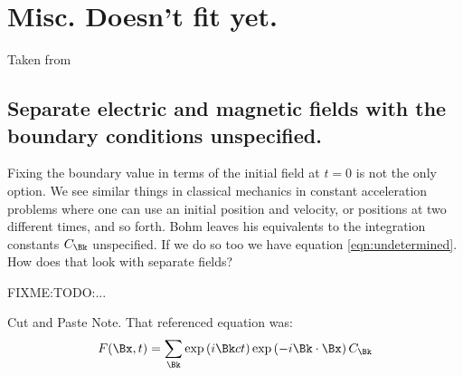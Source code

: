 \documentclass{article}
\title{}
\author{Peeter Joot \quad peeter.joot@gmail.com}
\date{ Feb dd, 2009.  Last Revision: $Date: 2009/02/22 15:11:52 $ }
\begin{document}
\maketitle{}

\tableofcontents

\section{}

\section{ Misc.  Doesn't fit yet. }

Taken from \cite{PJFourierVacuum}


\subsection{ Separate electric and magnetic fields with the boundary conditions unspecified. }

Fixing the boundary value in terms of the initial field at $t=0$ is not the only option.  We see similar things in classical mechanics in constant acceleration problems where one can use an initial position and velocity, or positions at two different times, and so forth.  Bohm leaves his equivalents to the integration constants $C_{\Bk}$ unspecified.  If we do so too we have equation \ref{eqn:undetermined}.  How does that look with separate fields?

FIXME:TODO:...  

Cut and Paste Note.  That referenced equation was:
\begin{align}\label{eqn:undetermined}
F(\Bx,t) = \sum_{\Bk} 
\exp\left(i \Bk c t \right) 
\exp\left(-i \Bk \cdot \Bx \right) 
C_{\Bk} 
\end{align}



\end{document}
